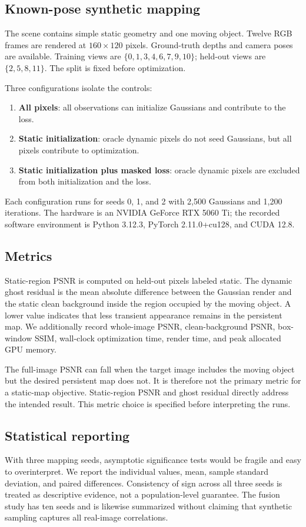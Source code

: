 \documentclass[10pt,conference]{IEEEtran}
\begin{document}
\subsection{Known-pose synthetic mapping}
The scene contains simple static geometry and one moving object. Twelve RGB frames are rendered at $160\times120$ pixels. Ground-truth depths and camera poses are available. Training views are $\{0,1,3,4,6,7,9,10\}$; held-out views are $\{2,5,8,11\}$. The split is fixed before optimization.

Three configurations isolate the controls:
\begin{enumerate}
\item \textbf{All pixels}: all observations can initialize Gaussians and contribute to the loss.
\item \textbf{Static initialization}: oracle dynamic pixels do not seed Gaussians, but all pixels contribute to optimization.
\item \textbf{Static initialization plus masked loss}: oracle dynamic pixels are excluded from both initialization and the loss.
\end{enumerate}
Each configuration runs for seeds 0, 1, and 2 with 2,500 Gaussians and 1,200 iterations. The hardware is an NVIDIA GeForce RTX 5060 Ti; the recorded software environment is Python 3.12.3, PyTorch 2.11.0+cu128, and CUDA 12.8.

\subsection{Metrics}
Static-region PSNR is computed on held-out pixels labeled static. The dynamic ghost residual is the mean absolute difference between the Gaussian render and the static clean background inside the region occupied by the moving object. A lower value indicates that less transient appearance remains in the persistent map. We additionally record whole-image PSNR, clean-background PSNR, box-window SSIM, wall-clock optimization time, render time, and peak allocated GPU memory.

The full-image PSNR can fall when the target image includes the moving object but the desired persistent map does not. It is therefore not the primary metric for a static-map objective. Static-region PSNR and ghost residual directly address the intended result. This metric choice is specified before interpreting the runs.

\subsection{Statistical reporting}
With three mapping seeds, asymptotic significance tests would be fragile and easy to overinterpret. We report the individual values, mean, sample standard deviation, and paired differences. Consistency of sign across all three seeds is treated as descriptive evidence, not a population-level guarantee. The fusion study has ten seeds and is likewise summarized without claiming that synthetic sampling captures all real-image correlations.
\end{document}
